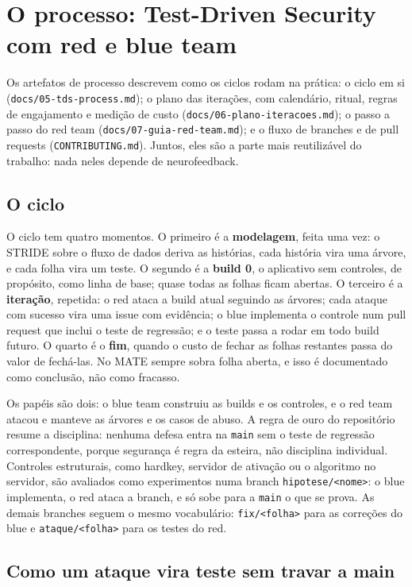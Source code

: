\section{O processo: Test-Driven Security com red e blue team}
\label{sec:processo}

Os artefatos de processo descrevem como os ciclos rodam na prática: o ciclo em si (\texttt{docs/05-tds-process.md}); o plano das iterações, com calendário, ritual, regras de engajamento e medição de custo (\texttt{docs/06-plano-iteracoes.md}); o passo a passo do red team (\texttt{docs/07-guia-red-team.md}); e o fluxo de branches e de pull requests (\texttt{CONTRIBUTING.md}). Juntos, eles são a parte mais reutilizável do trabalho: nada neles depende de neurofeedback.

\subsection{O ciclo}

O ciclo tem quatro momentos. O primeiro é a \textbf{modelagem}, feita uma vez: o STRIDE sobre o fluxo de dados deriva as histórias, cada história vira uma árvore, e cada folha vira um teste. O segundo é a \textbf{build 0}, o aplicativo sem controles, de propósito, como linha de base; quase todas as folhas ficam abertas. O terceiro é a \textbf{iteração}, repetida: o red ataca a build atual seguindo as árvores; cada ataque com sucesso vira uma issue com evidência; o blue implementa o controle num pull request que inclui o teste de regressão; e o teste passa a rodar em todo build futuro. O quarto é o \textbf{fim}, quando o custo de fechar as folhas restantes passa do valor de fechá-las. No MATE sempre sobra folha aberta, e isso é documentado como conclusão, não como fracasso.

Os papéis são dois: o blue team construiu as builds e os controles, e o red team atacou e manteve as árvores e os casos de abuso. A regra de ouro do repositório resume a disciplina: nenhuma defesa entra na \texttt{main} sem o teste de regressão correspondente, porque segurança é regra da esteira, não disciplina individual. Controles estruturais, como hardkey, servidor de ativação ou o algoritmo no servidor, são avaliados como experimentos numa branch \texttt{hipotese/<nome>}: o blue implementa, o red ataca a branch, e só sobe para a \texttt{main} o que se prova. As demais branches seguem o mesmo vocabulário: \texttt{fix/<folha>} para as correções do blue e \texttt{ataque/<folha>} para os testes do red.

\subsection{Como um ataque vira teste sem travar a main}

